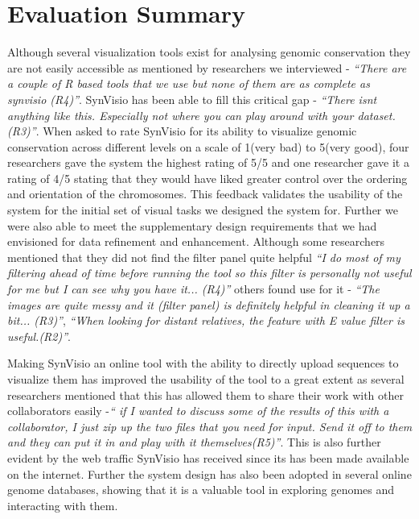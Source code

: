\section{Evaluation Summary}  
Although several visualization tools exist for analysing genomic conservation they are not easily accessible as mentioned by researchers we interviewed -  \textit{``There are a couple of R based tools that we use but none of them are as complete as synvisio (R4)''}. SynVisio has been able to fill this critical gap
- \textit{``There isnt anything like this. Especially not where you can play around with your dataset. (R3)''}. When asked to rate SynVisio for its ability to visualize genomic conservation across different levels on a scale of 1(very bad) to 5(very good), four researchers gave the system the highest rating of 5/5 and one researcher gave it a rating of 4/5 stating that they would have liked greater control over the ordering and orientation of the chromosomes. This feedback validates the usability of the system for the initial set of visual tasks we designed the system for. Further we were also able to meet the supplementary design requirements that we had envisioned for data refinement and enhancement. Although some researchers mentioned that they did not find the filter panel quite helpful \textit{``I do most of my filtering ahead of time before running the tool so this filter is personally not useful for me but I can see why you have it...
 (R4)''} others found use for it - \textit{``The images are quite messy and it (filter panel) is definitely helpful in cleaning it up a bit... (R3)''}, \textit{``When looking for distant relatives, the feature with E value filter is useful.(R2)''}. 
 
Making SynVisio an online tool with the ability to directly upload sequences to visualize them has improved the usability of the tool to a great extent as several researchers mentioned that this has allowed them to share their work with other collaborators easily -\textit{`` if I wanted to discuss some of the results of this with a collaborator, I just zip up the two files that you need for input. Send it off to them and they can put it in and play with it themselves(R5)''}. This is also further evident by the web traffic SynVisio has received since its has been made available on the internet. Further the system design has also been adopted in several online genome databases, showing that it is a valuable tool in exploring genomes and interacting with them.



